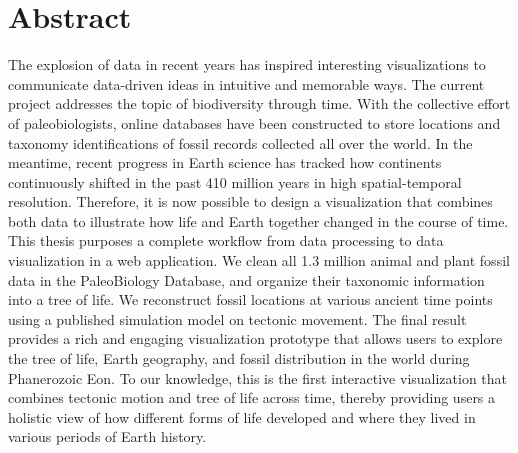 
\chapter{Abstract} \label{chp:abstract}

The explosion of data in recent years has inspired interesting visualizations to communicate data-driven ideas in intuitive and memorable ways. The current project addresses the topic of biodiversity through time. With the collective effort of paleobiologists, online databases have been constructed to store locations and taxonomy identifications of fossil records collected all over the world. In the meantime, recent progress in Earth science has tracked how continents continuously shifted in the past 410 million years in high spatial-temporal resolution. Therefore, it is now possible to design a visualization that combines both data to illustrate how life and Earth together changed in the course of time. \\

This thesis purposes a complete workflow from data processing to data visualization in a web application. We clean all 1.3 million animal and plant fossil data in the PaleoBiology Database, and organize their taxonomic information into a tree of life.  We reconstruct fossil locations at various ancient time points using a published simulation model on tectonic movement. The final result provides a rich and engaging visualization prototype that allows users to explore the tree of life, Earth geography, and fossil distribution in the world during Phanerozoic Eon. To our knowledge, this is the first interactive visualization that combines tectonic motion and tree of life across time, thereby providing users a holistic view of how different forms of life developed and where they lived in various periods of Earth history.
